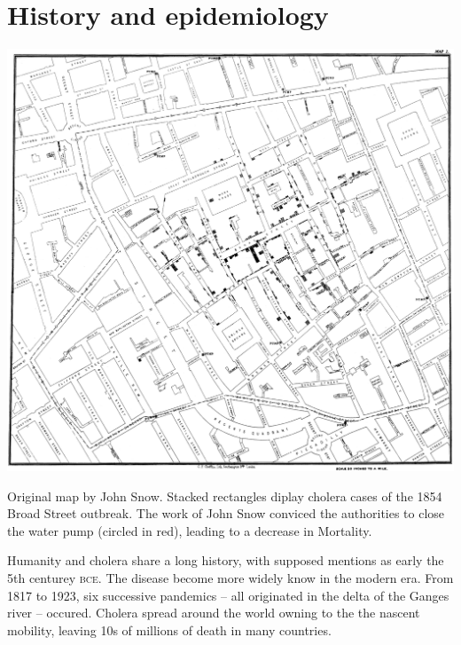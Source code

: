 \section{History and epidemiology}
\begin{marginfigure}[3\baselineskip]
\includegraphics[width=\textwidth]{fig/snow-cholera-map}
\caption[John Snow map of cluster cholera cases in London, 1854]{Original map by John Snow. Stacked rectangles diplay cholera cases of the 1854 Broad Street outbreak. The work of John Snow conviced the authorities to close the water pump (circled in red), leading to a decrease in Mortality.}\label{johnsnow}
\end{marginfigure}
Humanity and cholera share a long history, with supposed mentions as early the 5th centurey \textsc{bce}. The disease become more widely know in the modern era. From 1817 to 1923, six successive pandemics -- all originated in the delta of the Ganges river -- occured. Cholera spread around the world owning to the the nascent mobility, leaving 10s of millions of death in many countries.
